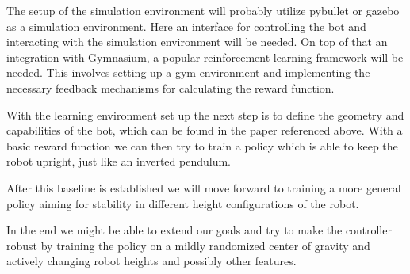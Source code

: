 \documentclass[a4paper]{article}
\begin{document}
The setup of the simulation environment will probably utilize pybullet or gazebo as a simulation
environment. Here an interface for controlling the bot and interacting with the simulation environment
will be needed. On top of that an integration with Gymnasium, a popular reinforcement learning
framework will be needed. This involves setting up a gym environment and implementing the necessary
feedback mechanisms for calculating the reward function.

With the learning environment set up the next step is to define the geometry and capabilities of the
bot, which can be found in the paper referenced above. With a basic reward function we can then try
to train a policy which is able to keep the robot upright, just like an inverted pendulum.

After this baseline is established we will move forward to training a more general policy aiming for
stability in different height configurations of the robot.

In the end we might be able to extend our goals and try to make the controller robust by training
the policy on a mildly randomized center of gravity and actively changing robot heights and possibly
other features.
\end{document}

